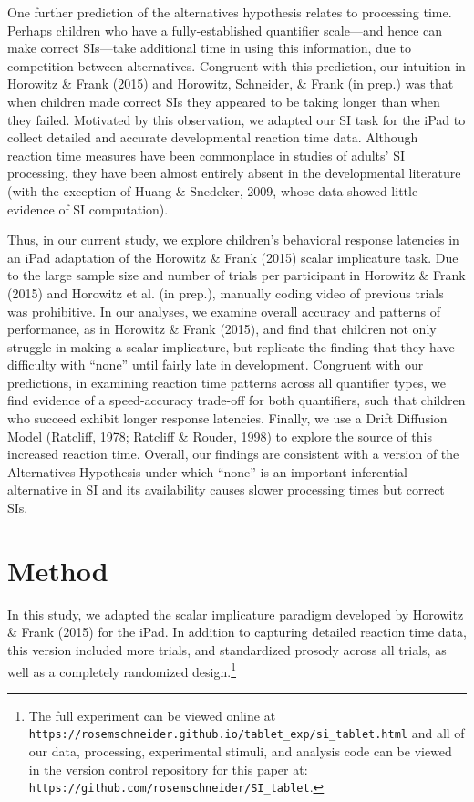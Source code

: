 \documentclass[10pt, letterpaper]{article}
\begin{document}
One further prediction of the alternatives hypothesis relates to
processing time. Perhaps children who have a fully-established
quantifier scale---and hence can make correct SIs---take additional time
in using this information, due to competition between alternatives.
Congruent with this prediction, our intuition in Horowitz \& Frank
(2015) and Horowitz, Schneider, \& Frank (in prep.) was that when
children made correct SIs they appeared to be taking longer than when
they failed. Motivated by this observation, we adapted our SI task for
the iPad to collect detailed and accurate developmental reaction time
data. Although reaction time measures have been commonplace in studies
of adults' SI processing, they have been almost entirely absent in the
developmental literature (with the exception of Huang \& Snedeker, 2009,
whose data showed little evidence of SI computation).

Thus, in our current study, we explore children's behavioral response
latencies in an iPad adaptation of the Horowitz \& Frank (2015) scalar
implicature task. Due to the large sample size and number of trials per
participant in Horowitz \& Frank (2015) and Horowitz et al. (in prep.),
manually coding video of previous trials was prohibitive. In our
analyses, we examine overall accuracy and patterns of performance, as in
Horowitz \& Frank (2015), and find that children not only struggle in
making a scalar implicature, but replicate the finding that they have
difficulty with ``none'' until fairly late in development. Congruent
with our predictions, in examining reaction time patterns across all
quantifier types, we find evidence of a speed-accuracy trade-off for
both quantifiers, such that children who succeed exhibit longer response
latencies. Finally, we use a Drift Diffusion Model (Ratcliff, 1978;
Ratcliff \& Rouder, 1998) to explore the source of this increased
reaction time. Overall, our findings are consistent with a version of
the Alternatives Hypothesis under which ``none'' is an important
inferential alternative in SI and its availability causes slower
processing times but correct SIs.

\section{Method}\label{method}

In this study, we adapted the scalar implicature paradigm developed by
Horowitz \& Frank (2015) for the iPad. In addition to capturing detailed
reaction time data, this version included more trials, and standardized
prosody across all trials, as well as a completely randomized
design.\footnote{The full experiment can be viewed online at \texttt{https://rosemschneider.github.io/tablet\_exp/si\_tablet.html} and all of our data, processing, experimental stimuli, and analysis code can be viewed in the version control repository for this paper at: \texttt{https://github.com/rosemschneider/SI\_tablet}.}
\end{document}
